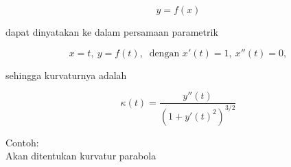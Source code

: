 \documentclass[a4paper,10pt]{article}
\begin{document}
\begin{eulernotebook}
\begin{eulercomment}
\begin{eulercomment}
\begin{eulercomment}
\begin{eulercomment}
\begin{eulercomment}
\begin{eulercomment}
\begin{eulercomment}
\begin{eulercomment}
\begin{eulercomment}
\begin{eulercomment}
\begin{eulercomment}
\begin{eulercomment}
\begin{eulercomment}
\begin{eulercomment}
\begin{eulercomment}
\begin{eulercomment}
\begin{eulercomment}
\begin{eulercomment}
\begin{eulercomment}
\begin{eulercomment}
\begin{eulercomment}
\begin{eulercomment}
\begin{eulercomment}
\end{eulercomment}
\begin{eulerformula}
\[
y=f(x)
\]
\end{eulerformula}
\begin{eulercomment}
dapat dinyatakan ke dalam persamaan parametrik

\end{eulercomment}
\begin{eulerformula}
\[
x=t,\ y=f(t),\ \text{ dengan } x'(t)=1,\ x''(t)=0,
\]
\end{eulerformula}
\begin{eulercomment}
sehingga kurvaturnya adalah

\end{eulercomment}
\begin{eulerformula}
\[
\kappa(t) = \frac{y''(t)}{\left(1+y'(t)^2\right)^{3/2}}
\]
\end{eulerformula}
\begin{eulercomment}
Contoh:\\
Akan ditentukan kurvatur parabola


\end{eulercomment}
\end{eulercomment}
\end{eulercomment}
\end{eulercomment}
\end{eulercomment}
\end{eulercomment}
\end{eulercomment}
\end{eulercomment}
\end{eulercomment}
\end{eulercomment}
\end{eulercomment}
\end{eulercomment}
\end{eulercomment}
\end{eulercomment}
\end{eulercomment}
\end{eulercomment}
\end{eulercomment}
\end{eulercomment}
\end{eulercomment}
\end{eulercomment}
\end{eulercomment}
\end{eulercomment}
\end{eulercomment}
\end{eulernotebook}
\end{document}
